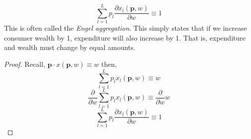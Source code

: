 \documentclass[12pt]{article}
\let\bf\oldbf
\let\bf\textbf
\begin{document}
\begin{equation}\sum^L_{l=1}p_l\frac{\partial x_l(\bf{p}, w)}{\partial w} \equiv 1\end{equation}
This is often called the \emph{Engel aggregation}. This simply states that if we increase consumer wealth by 1, expenditure will also increase by 1. That is, expenditure and wealth must change by equal amounts.
\begin{proof}
Recall, $\bf{p}\cdot x(\bf{p}, w) \equiv w$ then,
$$\sum^L_{l=1}p_lx_l(\bf{p},w) \equiv w$$
$$\frac{\partial}{\partial w}\sum^L_{l=1}p_lx_l(\bf{p},w) \equiv \frac{\partial}{\partial w}w$$
$$\sum^L_{l=1}p_l\frac{\partial x_l(\bf{p}, w)}{\partial w} \equiv 1$$
\end{proof}
\end{document}
